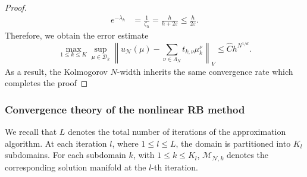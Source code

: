 \documentclass[12pt]{article}
\theoremstyle{remark}
\theoremstyle{definition}
\numberwithin{equation}{section}
\begin{document}
\begin{proof}
    \begin{align}
        e^{-\lambda_h}&=\frac{1}{\zeta_h}= \frac{h}{h +2\varepsilon}\leq \frac{h}{2\varepsilon}.
    \end{align} 
    Therefore, we obtain the error estimate
    \begin{equation}
          \max_{1 \leq k \leq K}\sup_{\mu \in \mathcal{D}_k} \left\|u_{\mathcal{N}}(\mu)-\sum_{\nu \in \Lambda_N} t_{k,\nu} \mu_k^\nu \right\|_V \leq \hat C h^{N^{1/d}}.
    \end{equation}
    As a result, the Kolmogorov $N$-width inherits the same convergence rate which completes the proof
    
\end{proof}




\subsubsection{Convergence theory of the nonlinear RB method}
We recall that $L$ denotes the total number of iterations of the approximation algorithm. At each iteration $l$, where $1 \leq l \leq L $, the domain is partitioned into  $K_l$  subdomains. For each subdomain $k$, with $ 1 \leq k \leq K_l $,  $\mathcal{M}_{\mathcal{N},k}$ denotes the corresponding solution manifold at the $l$-th iteration.
\end{document}
